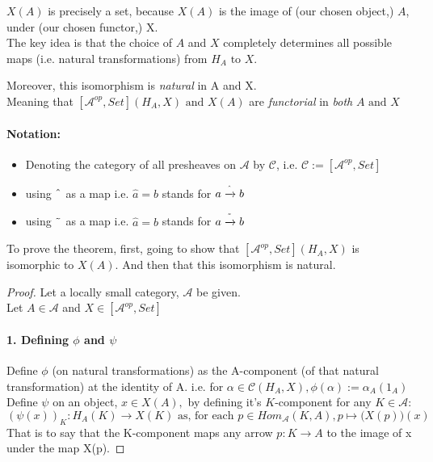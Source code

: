 \documentclass[18pt,a4paper]{extarticle}
\theoremstyle{theorem}
\theoremstyle{definition}
\theoremstyle{lemma}
\begin{document}
$X(A)$ is precisely a set, because $X(A)$ is the image of (our chosen object,) $A$, under (our chosen functor,) X. \\

The key idea is that the choice of $A$ and $X$ completely determines all possible maps
(i.e. natural transformations) from $H_A \text{ to } X$.

Moreover, this isomorphism is \textit{natural} in A and X. \\
Meaning that $[ \mathcal{A}^{op},Set](H_A,X) \text{ and } X(A)$ are
\textit{functorial} in \textit{both} $A \text{ and } X$

\paragraph{Notation:} \begin{itemize}
\item Denoting the category of all presheaves on $\mathcal{A} $ by $\mathcal{C}$,
	i.e. $\mathcal{C}:=[ \mathcal{A} ^{op}, Set] $
\item using $\string ^ $ as a map i.e. $\hat a = b$ stands for $a \xrightarrow{\string ^} b$
\item using $\string ~ $ as a map i.e. $\hat a = b$ stands for $a \xrightarrow{\string ~} b$
\end{itemize}

To prove the theorem, first,
going to show that $[ \mathcal{A} ^{op}, Set](H_A,X)$ is isomorphic to $X(A)$. And then that
this isomorphism is natural.

\begin{proof}Let a locally small category,  $\mathcal{A} $ be given. \\
	Let $A \in \mathcal{A} $ and $X \in [ \mathcal{A} ^{op}, Set]$\\

	\paragraph{1. Defining $\phi$ and $\psi$}
	Define $\phi$ (on natural transformations) as the A-component (of that natural transformation)
	at the identity of A. i.e. for $\alpha \in \mathcal{C}(H_A,X) ,
	\phi(\alpha):= \alpha_A(1_A) $ \\

	Define $\psi$ on an object, $ x \in X(A), $
	by defining it's $K$-component for any $K \in \mathcal{A} $:
	\[({\psi(x)})_K : H_A(K) \to X(K)
	\text{ as, for each } p\in Hom_{\mathcal{A} }(K,A), p \mapsto \Big(X(p)\Big)(x) \]
	That is to say that the K-component maps any arrow $p:K \to A$
	to the image of x under the map X(p).

\end{proof}
\end{document}
